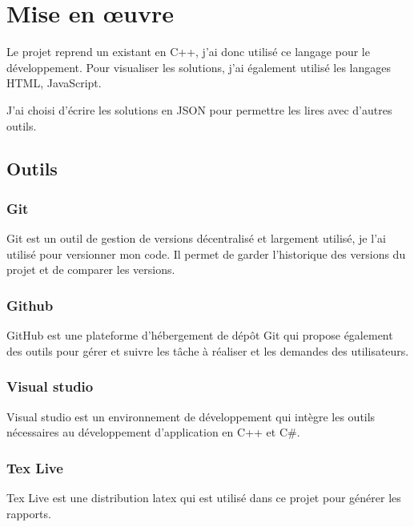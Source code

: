 \chapter{Mise en œuvre}
\label{appendix:mise_en_oeuvre}

Le projet reprend un existant en C++, j'ai donc utilisé ce langage pour le développement.
Pour visualiser les solutions, j'ai également utilisé les langages HTML, JavaScript.

J'ai choisi d'écrire les solutions en JSON pour permettre les lires avec d'autres outils.


\section{Outils}


\subsection{Git}
Git est un outil de gestion de versions décentralisé et largement utilisé, je l'ai utilisé pour versionner mon code.
Il permet de garder l'historique des versions du projet et de comparer les versions.

\subsection{Github}
GitHub est une plateforme d'hébergement de dépôt Git qui propose également des outils pour gérer et suivre les tâche à réaliser et les demandes des utilisateurs.

\subsection{Visual studio}
Visual studio est un environnement de développement qui intègre les outils nécessaires au développement d'application en C++ et C\#.

\subsection{Tex Live}
Tex Live est une distribution latex qui est utilisé dans ce projet pour générer les rapports.

